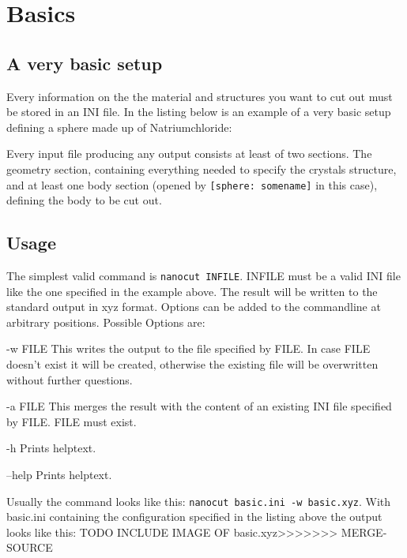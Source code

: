 \section{Basics}
\subsection{A very basic setup}

Every information on the the material and structures you want to cut out must be stored in an INI file. In the listing below is an example of a very basic setup defining a sphere made up of Natriumchloride:

Every input file producing any output consists at least of two sections. The geometry section, containing everything needed to specify the crystals structure, and at least one body section (opened by \lstinline{[sphere: somename]} in this case), defining the body to be cut out.

\subsection{Usage}
The simplest valid command is \lstinline{nanocut INFILE}. INFILE must be a valid INI file like the one specified in the example above. The result will be written to the standard output in xyz format. Options can be added to the commandline at arbitrary positions. Possible Options are:
\begin{description}
 \item{-w FILE} This writes the output to the file specified by FILE. In case FILE doesn't exist it will be created, otherwise the existing file will be overwritten without further questions.
 \item{-a FILE} This merges the result with the content of an existing INI file specified by FILE. FILE must exist.
 \item{-h} Prints helptext.
 \item{--help} Prints helptext.
\end{description}
Usually the command looks like this: \lstinline{nanocut basic.ini -w basic.xyz}. With basic.ini containing the configuration specified in the listing above the output looks like this:
TODO INCLUDE IMAGE OF basic.xyz>>>>>>> MERGE-SOURCE
